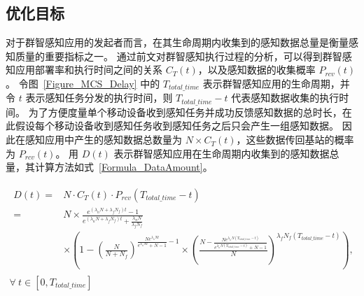 



\subsection{优化目标}

对于群智感知应用的发起者而言，在其生命周期内收集到的感知数据总量是衡量感知质量的重要指标之一。
通过前文对群智感知执行过程的分析，可以得到群智感知应用部署率和执行时间之间的关系 $C_T(t)$，以及感知数据的收集概率 $P_{rcv}(t)$。
令图~\ref{Figure_MCS_Delay} 中的 $T_{total\_time}$ 表示群智感知应用的生命周期，并令 $t$ 表示感知任务分发的执行时间，则 $T_{total\_time} - t$ 代表感知数据收集的执行时间。
为了方便度量单个移动设备收到感知任务并成功反馈感知数据的总时长，在此假设每个移动设备收到感知任务收到感知任务之后只会产生一组感知数据。
因此在感知应用中产生的感知数据总数量为 $N \times C_T(t)$，这些数据传回基站的概率为 $P_{rcv}(t)$。
用 $D(t)$ 表示群智感知应用在生命周期内收集到的感知数据总量，其计算方法如式~\eqref{Formula_DataAmount}。

\vspace{-2.5em}
\begin{equation}
  \label{Formula_DataAmount}
  \begin{gathered}
    \begin{aligned}
      D(t) = &N \cdot C_T(t) \cdot P_{rcv}(T_{total\_time}-t)\\
      = &N \times \frac{e^{(\lambda_n N + \lambda_f N_f) t} - 1}{e^{(\lambda_n N + \lambda_f N_f) t} + \frac{\lambda_n N}{\lambda_f N_f}} \\
      &\times (1 -  (\frac{N}{N + N_f})^{\frac{N e^{\lambda_n N t}}{e^{\lambda_n N t} + N -1} - 1} \times (\frac{N-\frac{N e^{\lambda_n N (T_{total\_time} - t)}}{e^{\lambda_n N (T_{total\_time} - t)} + N -1}}{N})^{\lambda_f N_f (T_{total\_time} - t)}),
    \end{aligned}\\
    \forall \ t \in [0, T_{total\_time}]
  \end{gathered}
\end{equation}

